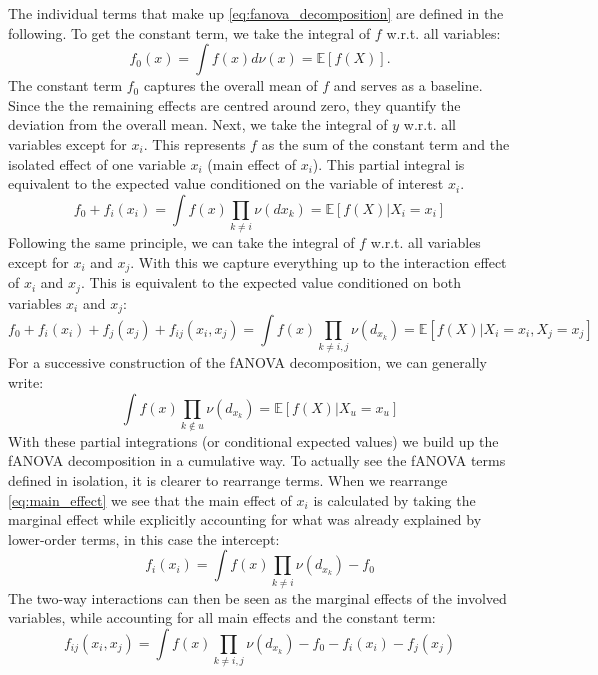 The individual terms that make up \autoref{eq:fanova_decomposition} are defined in the following.
To get the constant term, we take the integral of $f$ w.r.t. all variables:
\begin{equation}
    f_{0}(x) = \int f(x) d\nu(x) = \mathbb{E}[f(X)].
    \label{eq:intercapt}
\end{equation}
The constant term $f_0$ captures the overall mean of $f$ and serves as a baseline. Since the the remaining effects are centred around zero, they quantify the deviation from the overall mean.  Next, we take the integral of $y$ w.r.t. all variables except for $x_i$. This represents $f$ as the sum of the constant term and the isolated effect of one variable $x_i$ (main effect of $x_i$). This partial integral is equivalent to the expected value conditioned on the variable of interest $x_i$.
\begin{equation}
    f_0 + f_i(x_i) = \int f(x) \prod_{k \neq i} \nu(dx_{k}) = \mathbb{E}[f(X) | X_i = x_i]
    \label{eq:main_effect}
\end{equation}
Following the same principle, we can take the integral of $f$ w.r.t. all variables except for $x_i$ and $x_j$. With this we capture everything up to the interaction effect of $x_i$ and $x_j$. This is equivalent to the expected value conditioned on both variables $x_i$ and $x_j$:
\begin{equation}
    f_0 + f_i(x_i) + f_j(x_j) + f_{ij}(x_i,x_j) = \int f(x) \prod_{k \neq i,j} \nu(d_{x_{k}}) = \mathbb{E}[f(X) | X_i = x_i, X_j = x_j]
    \label{eq:interaction_effects}
\end{equation}
For a successive construction of the fANOVA decomposition, we can generally write:
\begin{equation}
    \int f(x) \prod_{k \notin u} \nu(d_{x_{k}}) = \mathbb{E}[f(X) | X_u = x_u]
    \label{eq:fanova_component}
\end{equation}
With these partial integrations (or conditional expected values) we build up the fANOVA decomposition in a cumulative way. To actually see the fANOVA terms defined in isolation, it is clearer to rearrange terms. When we rearrange \autoref{eq:main_effect} we see that the main effect of $x_i$ is calculated by taking the marginal effect while explicitly accounting for what was already explained by lower-order terms, in this case the intercept:
\begin{equation}
    f_i(x_i) = \int f(x) \prod_{k \neq i} \nu(d_{x_{k}}) - f_0
    \label{eq:main_effect_rearranged}
\end{equation}
The two-way interactions can then be seen as the marginal effects of the involved variables, while accounting for all main effects and the constant term:
\begin{equation}
    f_{ij}(x_i,x_j) = \int f(x) \prod_{k \neq i,j} \nu(d_{x_{k}}) - f_0 - f_i(x_i) - f_j(x_j) 
    \label{eq:interaction_effects}
\end{equation}

